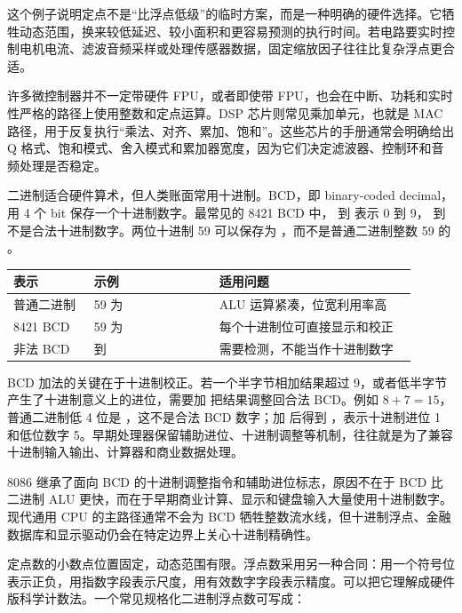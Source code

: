 这个例子说明定点不是“比浮点低级”的临时方案，而是一种明确的硬件选择。它牺牲动态范围，换来较低延迟、较小面积和更容易预测的执行时间。若电路要实时控制电机电流、滤波音频采样或处理传感器数据，固定缩放因子往往比复杂浮点更合适。

\begin{chipcase}
许多微控制器并不一定带硬件 FPU，或者即使带 FPU，也会在中断、功耗和实时性严格的路径上使用整数和定点运算。DSP 芯片则常见乘加单元，也就是 MAC 路径，用于反复执行“乘法、对齐、累加、饱和”。这些芯片的手册通常会明确给出 Q 格式、饱和模式、舍入模式和累加器宽度，因为它们决定滤波器、控制环和音频处理是否稳定。
\end{chipcase}

二进制适合硬件算术，但人类账面常用十进制。BCD，即 binary-coded decimal，用 4 个 bit 保存一个十进制数字。最常见的 8421 BCD 中， 到  表示 0 到 9， 到  不是合法十进制数字。两位十进制 59 可以保存为 ，而不是普通二进制整数 59 的 。

\begin{longtable}{L{0.18\linewidth}L{0.28\linewidth}L{0.44\linewidth}}
\toprule
表示 & 示例 & 适用问题 \\
\midrule
普通二进制 & 59 为  & ALU 运算紧凑，位宽利用率高 \\
8421 BCD & 59 为  & 每个十进制位可直接显示和校正 \\
非法 BCD &  到  & 需要检测，不能当作十进制数字 \\
\bottomrule
\end{longtable}

BCD 加法的关键在于十进制校正。若一个半字节相加结果超过 9，或者低半字节产生了十进制意义上的进位，需要加  把结果调整回合法 BCD。例如 $8+7=15$，普通二进制低 4 位是 ，这不是合法 BCD 数字；加  后得到 ，表示十进制进位 1 和低位数字 5。早期处理器保留辅助进位、十进制调整等机制，往往就是为了兼容十进制输入输出、计算器和商业数据处理。

\begin{chipcase}
8086 继承了面向 BCD 的十进制调整指令和辅助进位标志，原因不在于 BCD 比二进制 ALU 更快，而在于早期商业计算、显示和键盘输入大量使用十进制数字。现代通用 CPU 的主路径通常不会为 BCD 牺牲整数流水线，但十进制浮点、金融数据库和显示驱动仍会在特定边界上关心十进制精确性。
\end{chipcase}

定点数的小数点位置固定，动态范围有限。浮点数采用另一种合同：用一个符号位表示正负，用指数字段表示尺度，用有效数字字段表示精度。可以把它理解成硬件版科学计数法。一个常见规格化二进制浮点数可写成：

